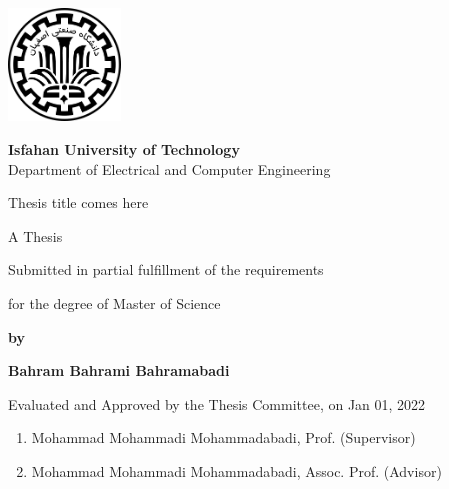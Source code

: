 \thispagestyle{empty}
\begin{latin}
\begin{center}
\includegraphics[height=3cm]{images/iut_logo.png}
\vspace{0.4cm}

{\large\textbf{Isfahan University of Technology}}\\

\vspace{0.4cm}
Department of Electrical and Computer Engineering

\vspace{2.5cm}

{\huge Thesis title comes here}

\vspace{1.5cm}

{\large
	A Thesis
	
	\vspace{.3cm}
	
	Submitted in partial fulfillment of the requirements
	
	\vspace{.3cm}
	
	for the degree of Master of Science
}

	\vspace{1.5cm}

{\Large
	\textbf{by}
	
	\vspace{.3cm}
	
	\textbf{Bahram Bahrami Bahramabadi}
}
\end{center}

\vfill

Evaluated and Approved by the Thesis Committee, on Jan 01, 2022
\vspace{0.5cm}

\begin{enumerate}
\item Mohammad Mohammadi Mohammadabadi, Prof. (Supervisor)
\vspace{0.5cm}

\item Mohammad Mohammadi Mohammadabadi, Assoc. Prof. (Advisor)
\vspace{0.5cm}


\end{enumerate}
\end{latin}
